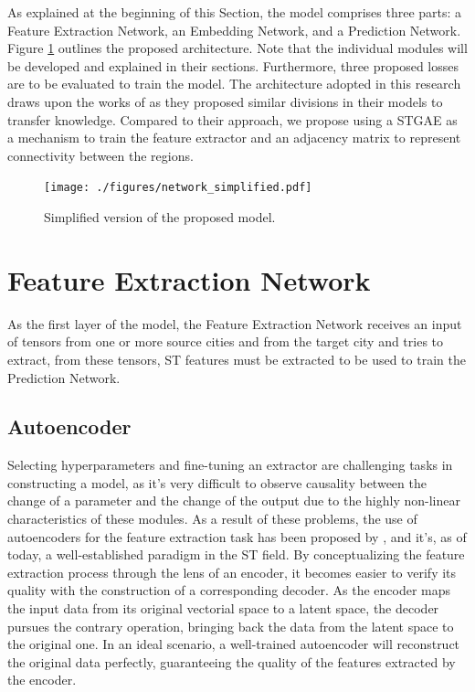 As explained at the beginning of this Section, the model comprises three parts: a Feature Extraction Network, an Embedding Network, and a Prediction Network. Figure \ref{fig:network_simplified} outlines the proposed architecture. Note that the individual modules will be developed and explained in their sections. Furthermore, three proposed losses are to be evaluated to train the model. The architecture adopted in this research draws upon the works of \cite{Wang202222, Wang20224695} as they proposed similar divisions in their models to transfer knowledge. Compared to their approach, we propose using a \gls{STGAE} as a mechanism to train the feature extractor and an adjacency matrix to represent connectivity between the regions.

\begin{figure}[!ht]
\noindent\hspace{0.5mm}\texttt{[image: ./figures/network\_simplified.pdf]}
\caption{Simplified version of the proposed model.}
\label{fig:network_simplified}
\end{figure}

\section{Feature Extraction Network} \label{sec:fen}

As the first layer of the model, the Feature Extraction Network receives an input of tensors from one or more source cities and from the target city and tries to extract, from these tensors, \gls{ST} features must be extracted to be used to train the Prediction Network. 

\subsection{Autoencoder}
 
 Selecting hyperparameters and fine-tuning an extractor are challenging tasks in constructing a model, as it's very difficult to observe causality between the change of a parameter and the change of the output due to the highly non-linear characteristics of these modules. As a result of these problems, the use of autoencoders for the feature extraction task has been proposed by \cite{Hinton2006}, and it's, as of today, a well-established paradigm in the \gls{ST} field. By conceptualizing the feature extraction process through the lens of an encoder, it becomes easier to verify its quality with the construction of a corresponding decoder. As the encoder maps the input data from its original vectorial space to a latent space, the decoder pursues the contrary operation, bringing back the data from the latent space to the original one. In an ideal scenario, a well-trained autoencoder will reconstruct the original data perfectly, guaranteeing the quality of the features extracted by the encoder.
 
